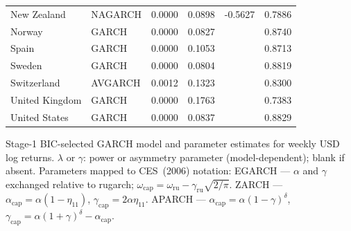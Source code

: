 \begin{table}[H]
\begin{threeparttable}
\begin{tabular}{llSSSS}
\hspace{1em}New Zealand & NAGARCH & 0.0000 & 0.0898 & -0.5627 & 0.7886 \\
\hspace{1em}Norway & GARCH & 0.0000 & 0.0827 & {} & 0.8740 \\
\hspace{1em}Spain & GARCH & 0.0000 & 0.1053 & {} & 0.8713 \\
\hspace{1em}Sweden & GARCH & 0.0000 & 0.0804 & {} & 0.8819 \\
\hspace{1em}Switzerland & AVGARCH & 0.0012 & 0.1323 & {} & 0.8300 \\
\hspace{1em}United Kingdom & GARCH & 0.0000 & 0.1763 & {} & 0.7383 \\
\hspace{1em}United States & GARCH & 0.0000 & 0.0837 & {} & 0.8829 \\
\bottomrule
\end{tabular}
\begin{tablenotes}[flushleft]
\small
\item Stage-1 BIC-selected GARCH model and parameter estimates for weekly USD log returns. $\lambda$ or $\gamma$: power or asymmetry parameter (model-dependent); blank if absent. Parameters mapped to CES~(2006) notation: EGARCH --- $\alpha$ and $\gamma$ exchanged relative to rugarch; $\omega_{\text{cap}}=\omega_{\text{ru}}-\gamma_{\text{ru}}\sqrt{2/\pi}$. ZARCH --- $\alpha_{\text{cap}}=\alpha(1-\eta_{11})$, $\gamma_{\text{cap}}=2\alpha\eta_{11}$. APARCH --- $\alpha_{\text{cap}}=\alpha(1-\gamma)^\delta$, $\gamma_{\text{cap}}=\alpha(1+\gamma)^\delta-\alpha_{\text{cap}}$.
\end{tablenotes}
\end{threeparttable}
\end{table}
